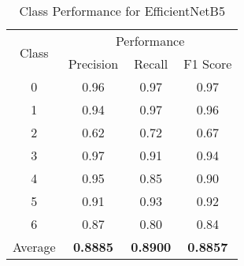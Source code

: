 \begin{table}
    \centering
    \begin{tabular}{c | c c c}
        \hline
        \multirow{2}{*}{Class} & 
            \multicolumn{3}{c}{Performance}\\
            & Precision & Recall & F1 Score\\
        \hline
        0 & 0.96   &   0.97  &    0.97\\
        1 & 0.94   &   0.97  &    0.96\\
        2 & 0.62   &   0.72  &    0.67\\
        3 & 0.97   &   0.91  &    0.94\\
        4 & 0.95   &   0.85  &    0.90\\
        5 & 0.91   &   0.93  &    0.92\\
        6 & 0.87   &   0.80  &    0.84\\
        Average & \textbf{0.8885} & \textbf{0.8900} & \textbf{0.8857}\\
        \hline
    \end{tabular}
    \caption{Class Performance for EfficientNetB5}
    \label{tab:B5 Class report}
\end{table}